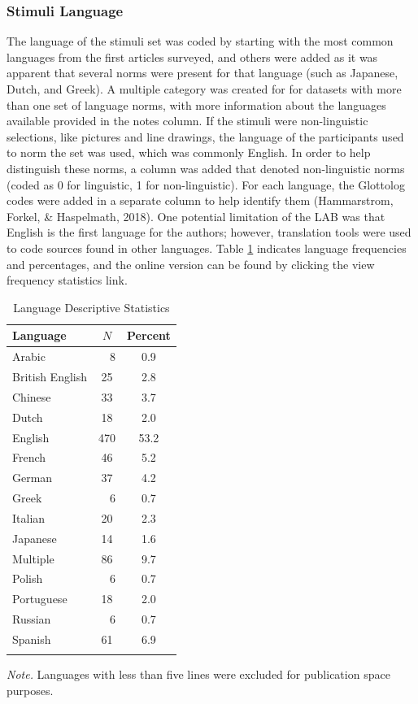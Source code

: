 \documentclass[english,,man]{apa6}
\theoremstyle{definition}
\theoremstyle{definition}
\theoremstyle{definition}
\theoremstyle{remark}
\begin{document}
\hypertarget{stimuli-language}{%
\subsubsection{Stimuli Language}\label{stimuli-language}}

The language of the stimuli set was coded by starting with the most
common languages from the first articles surveyed, and others were added
as it was apparent that several norms were present for that language
(such as Japanese, Dutch, and Greek). A multiple category was created
for for datasets with more than one set of language norms, with more
information about the languages available provided in the notes column.
If the stimuli were non-linguistic selections, like pictures and line
drawings, the language of the participants used to norm the set was
used, which was commonly English. In order to help distinguish these
norms, a column was added that denoted non-linguistic norms (coded as 0
for linguistic, 1 for non-linguistic). For each language, the Glottolog
codes were added in a separate column to help identify them
(Hammarstrom, Forkel, \& Haspelmath, 2018). One potential limitation of
the LAB was that English is the first language for the authors; however,
translation tools were used to code sources found in other languages.
Table \ref{tab:lang-table} indicates language frequencies and
percentages, and the online version can be found by clicking the view
frequency statistics link.

\begin{table}[tbp]
\begin{center}
\begin{threeparttable}
\caption{\label{tab:lang-table}Language Descriptive Statistics}
\begin{tabular}{lcc}
\toprule
Language & $N$ & Percent\\
\midrule
Arabic & \ \ 8 & 0.9\\
British English & 25 & 2.8\\
Chinese & 33 & 3.7\\
Dutch & 18 & 2.0\\
English & 470 & 53.2\\
French & 46 & 5.2\\
German & 37 & 4.2\\
Greek & \ \ 6 & 0.7\\
Italian & 20 & 2.3\\
Japanese & 14 & 1.6\\
Multiple & 86 & 9.7\\
Polish & \ \ 6 & 0.7\\
Portuguese & 18 & 2.0\\
Russian & \ \ 6 & 0.7\\
Spanish & 61 & 6.9\\
\bottomrule
\addlinespace
\end{tabular}
\begin{tablenotes}[para]
\normalsize{\textit{Note.} Languages with less than five lines were excluded for publication space purposes.}
\end{tablenotes}
\end{threeparttable}
\end{center}
\end{table}
\end{document}
